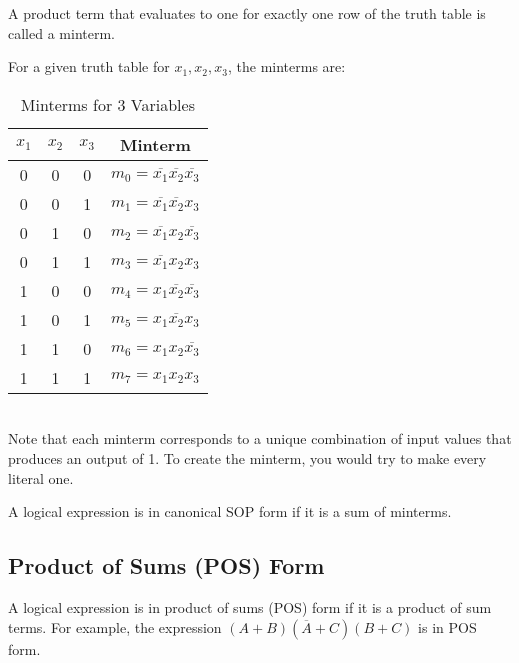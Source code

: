 \documentclass[11pt]{report}
\begin{document}
\begin{definition}[Minterm]
    A product term that evaluates to one for exactly one row of the truth table is called a minterm.
\end{definition}
\begin{example}[Minterm]
    For a given truth table for $x_1, x_2, x_3$, the minterms are:
    \begin{table}[h!]
        \centering
        \begin{tabular}{|c|c|c|c|}
            \hline
            $x_1$ & $x_2$ & $x_3$ & Minterm \\
            \hline
            0 & 0 & 0 & $m_0 = \overline{x_1}\overline{x_2}\overline{x_3}$ \\
            0 & 0 & 1 & $m_1 = \overline{x_1}\overline{x_2}x_3$ \\
            0 & 1 & 0 & $m_2 = \overline{x_1}x_2\overline{x_3}$ \\
            0 & 1 & 1 & $m_3 = \overline{x_1}x_2x_3$ \\
            1 & 0 & 0 & $m_4 = x_1\overline{x_2}\overline{x_3}$ \\
            1 & 0 & 1 & $m_5 = x_1\overline{x_2}x_3$ \\
            1 & 1 & 0 & $m_6 = x_1x_2\overline{x_3}$ \\
            1 & 1 & 1 & $m_7 = x_1x_2x_3$ \\
            \hline
        \end{tabular}
        \caption{Minterms for 3 Variables}
        \label{tab:minterms}

    \end{table}
    \\
    Note that each minterm corresponds to a unique combination of input values that produces an output of 1. To create the minterm, you would try to make every literal one.

\end{example}

\begin{definition}
    A logical expression is in canonical SOP form if it is a sum of minterms. 
\end{definition}

\subsection{Product of Sums (POS) Form}

\begin{definition}
    A logical expression is in product of sums (POS) form if it is a product of sum terms. For example, the expression $(A + B)(\overline{A} + C)(B + C)$ is in POS form.
\end{definition}
\end{document}
